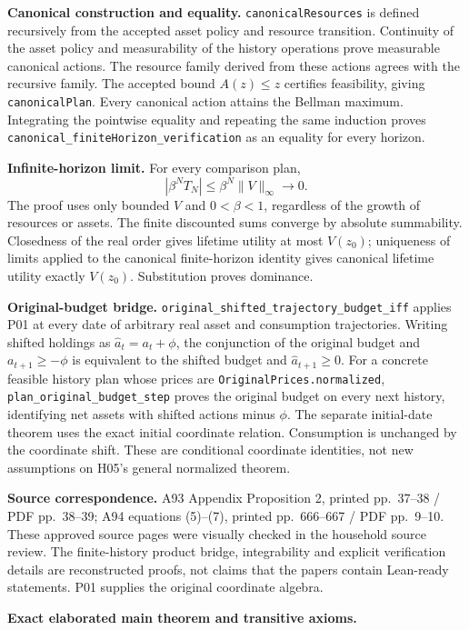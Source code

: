 \documentclass[
  11pt,
]{article}
\let\LedgerOriginalTexttt\texttt
\renewcommand{\texttt}[1]{{\small\LedgerOriginalTexttt{#1}}}
\begin{document}
\textbf{Canonical construction and equality.}
\texttt{canonicalResources} is defined recursively from the accepted
asset policy and resource transition. Continuity of the asset policy and
measurability of the history operations prove measurable canonical
actions. The resource family derived from these actions agrees with the
recursive family. The accepted bound \(A(z)\leq z\) certifies
feasibility, giving \texttt{canonicalPlan}. Every canonical action
attains the Bellman maximum. Integrating the pointwise equality and
repeating the same induction proves
\texttt{canonical\_finiteHorizon\_verification} as an equality for every
horizon.

\textbf{Infinite-horizon limit.} For every comparison plan,
\[|\beta^N T_N|\leq\beta^N\|V\|_\infty\longrightarrow0.\] The proof uses
only bounded \(V\) and \(0<\beta<1\), regardless of the growth of
resources or assets. The finite discounted sums converge by absolute
summability. Closedness of the real order gives lifetime utility at most
\(V(z_0)\); uniqueness of limits applied to the canonical finite-horizon
identity gives canonical lifetime utility exactly \(V(z_0)\).
Substitution proves dominance.

\textbf{Original-budget bridge.}
\texttt{original\_shifted\_trajectory\_budget\_iff} applies P01 at every
date of arbitrary real asset and consumption trajectories. Writing
shifted holdings as \(\widehat a_t=a_t+\phi\), the conjunction of the
original budget and \(a_{t+1}\geq-\phi\) is equivalent to the shifted
budget and \(\widehat a_{t+1}\geq0\). For a concrete feasible history
plan whose prices are \texttt{OriginalPrices.normalized},
\texttt{plan\_original\_budget\_step} proves the original budget on
every next history, identifying net assets with shifted actions minus
\(\phi\). The separate initial-date theorem uses the exact initial
coordinate relation. Consumption is unchanged by the coordinate shift.
These are conditional coordinate identities, not new assumptions on
H05's general normalized theorem.

\textbf{Source correspondence.} A93 Appendix Proposition 2, printed
pp.~37--38 / PDF pp.~38--39; A94 equations (5)--(7), printed
pp.~666--667 / PDF pp.~9--10. These approved source pages were visually
checked in the household source review. The finite-history product
bridge, integrability and explicit verification details are
reconstructed proofs, not claims that the papers contain Lean-ready
statements. P01 supplies the original coordinate algebra.

\textbf{Exact elaborated main theorem and transitive axioms.}
\end{document}

